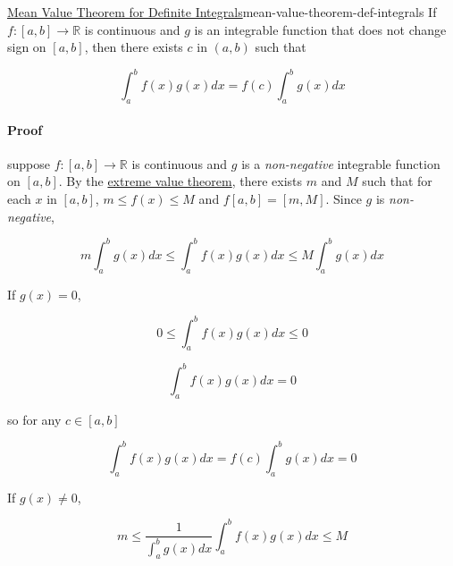 \begin{Theorem}{\href{https://en.wikipedia.org/wiki/Mean\_value\_theorem\#First\_mean\_value\_theorem\_for\_definite\_integrals}{Mean Value Theorem for Definite Integrals}}{mean-value-theorem-def-integrals}
    If $f: [a, b] \rightarrow \mathbb{R}$ is continuous and $g$ is an integrable function that does not change sign on
    $[a, b]$, then there exists $c$ in $(a, b)$ such that

    \begin{equation}
        \int_a^b f(x)g(x)dx = f(c)\int_a^b g(x)dx
    \end{equation}

    \tcblower

    \paragraph{Proof}

    suppose $f: [a, b] \rightarrow \mathbb{R}$ is continuous and $g$ is a \textit{non-negative} integrable function
    on $[a, b]$. By the \href{https://en.wikipedia.org/wiki/Extreme\_value\_theorem}{extreme value theorem}, there
    exists $m$ and $M$ such that for each $x$ in $[a, b]$, $m \le f(x) \le M$ and $f[a, b] = [m, M]$. Since $g$ is
    \textit{non-negative},

    \begin{equation}
        m\int_a^b g(x)dx \le \int_a^b f(x)g(x)dx \le M\int_a^b g(x)dx
    \end{equation}

    If $g(x) = 0$,

    \begin{equation}
        0 \le \int_a^b f(x)g(x)dx \le 0
    \end{equation}

    \begin{equation}
        \int_a^b f(x)g(x)dx = 0
    \end{equation}

    so for any $c \in [a, b]$

    \begin{equation}
        \int_a^b f(x)g(x)dx = f(c)\int_a^b g(x)dx = 0
    \end{equation}

    If $g(x) \ne 0$,

    \begin{equation}
        m \le \frac{1}{\int_a^b g(x)dx}\int_a^b f(x)g(x)dx \le M
    \end{equation}


\end{Theorem}
